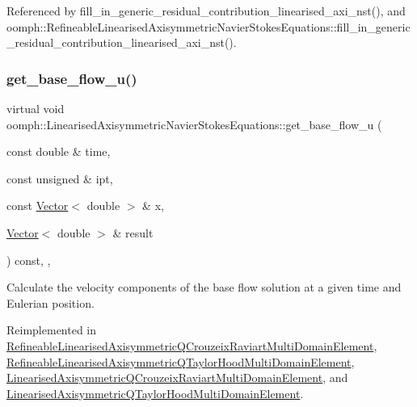 Referenced by fill\+\_\+in\+\_\+generic\+\_\+residual\+\_\+contribution\+\_\+linearised\+\_\+axi\+\_\+nst(), and oomph\+::\+Refineable\+Linearised\+Axisymmetric\+Navier\+Stokes\+Equations\+::fill\+\_\+in\+\_\+generic\+\_\+residual\+\_\+contribution\+\_\+linearised\+\_\+axi\+\_\+nst().

\mbox{\label{classoomph_1_1LinearisedAxisymmetricNavierStokesEquations_a74c8399c96e4870f831dcc01986a72cd}} 
\subsubsection{\texorpdfstring{get\+\_\+base\+\_\+flow\+\_\+u()}{get\_base\_flow\_u()}}
{\footnotesize\ttfamily virtual void oomph\+::\+Linearised\+Axisymmetric\+Navier\+Stokes\+Equations\+::get\+\_\+base\+\_\+flow\+\_\+u (\begin{DoxyParamCaption}\item[{const double \&}]{time,  }\item[{const unsigned \&}]{ipt,  }\item[{const \hyperlink{classoomph_1_1Vector}{Vector}$<$ double $>$ \&}]{x,  }\item[{\hyperlink{classoomph_1_1Vector}{Vector}$<$ double $>$ \&}]{result }\end{DoxyParamCaption}) const\hspace{0.3cm}{\ttfamily [inline]}, {\ttfamily [protected]}, {\ttfamily [virtual]}}



Calculate the velocity components of the base flow solution at a given time and Eulerian position. 



Reimplemented in \hyperlink{classRefineableLinearisedAxisymmetricQCrouzeixRaviartMultiDomainElement_a7c3e497fd77af087d4e9300810faf38e}{Refineable\+Linearised\+Axisymmetric\+Q\+Crouzeix\+Raviart\+Multi\+Domain\+Element}, \hyperlink{classRefineableLinearisedAxisymmetricQTaylorHoodMultiDomainElement_aa1337108dab29eed1dc7b27d8f15382a}{Refineable\+Linearised\+Axisymmetric\+Q\+Taylor\+Hood\+Multi\+Domain\+Element}, \hyperlink{classLinearisedAxisymmetricQCrouzeixRaviartMultiDomainElement_ad2f1cde1f47f056f58469c94c8ccea6d}{Linearised\+Axisymmetric\+Q\+Crouzeix\+Raviart\+Multi\+Domain\+Element}, and \hyperlink{classLinearisedAxisymmetricQTaylorHoodMultiDomainElement_a4e583d2145c56f10d26fdc8527128b54}{Linearised\+Axisymmetric\+Q\+Taylor\+Hood\+Multi\+Domain\+Element}.



